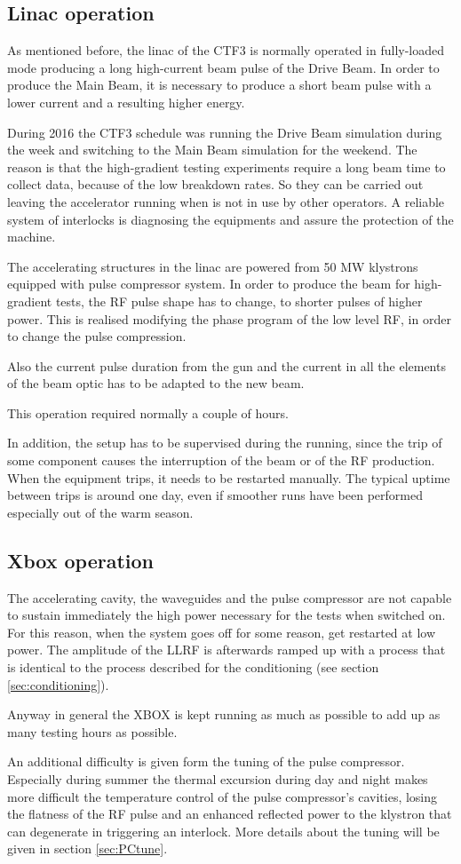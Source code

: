 \subsection{Linac operation}

As mentioned before, the linac of the CTF3 is normally operated in fully-loaded mode producing a long  high-current beam pulse of the Drive Beam. In order to produce the Main Beam, it is necessary to produce a short beam pulse with a lower current and a resulting higher energy. 

During 2016 the CTF3 schedule was running the Drive Beam simulation during the week and switching to the Main Beam simulation for the weekend. The reason is that the high-gradient testing experiments require a long beam time to collect data, because of the low breakdown rates. So they can be carried out leaving the accelerator running when is not in use by other operators. A reliable system of interlocks is diagnosing the equipments and assure the protection of the machine.

The accelerating structures in the linac are powered from 50 MW klystrons equipped with pulse compressor system. 
In order to produce the beam for high-gradient tests, the RF pulse shape has to change, to shorter pulses of higher power. This is realised modifying the phase program of the low level RF, in order to change the pulse compression. 

Also the current pulse duration from the gun and the current in all the elements of the beam optic has to be adapted to the new beam.

This operation required normally a couple of hours.

In addition, the setup has to be supervised during the running, since the trip of some component causes the interruption of the beam or of the RF production. When the equipment trips, it needs to be restarted manually. The typical uptime between trips is around one day, even if smoother runs have been performed especially out of the warm season.


\subsection{Xbox operation}

The accelerating cavity, the waveguides and the pulse compressor are not capable to sustain immediately the high power necessary for the tests when switched on. For this reason, when the system goes off for some reason, get restarted at low power. The amplitude of the LLRF is afterwards ramped up with a process that is identical to the process described for the conditioning (see section \ref{sec:conditioning}).

Anyway in general the XBOX is kept running as much as possible to add up as many testing hours as possible.

An additional difficulty is given form the tuning of the pulse compressor. Especially during summer the thermal excursion during day and night makes more difficult the temperature control of the pulse compressor's cavities, losing the flatness of the RF pulse and an enhanced reflected power to the klystron that can degenerate in triggering an interlock. More details about the tuning will be given in section \ref{sec:PCtune}.